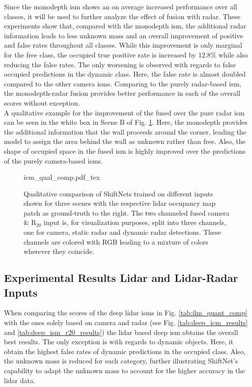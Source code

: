 Since the \gls{monodepth} \gls{ism} shows an on average increased performance over all classes, it will be used to further analyze the effect of fusion with radar. These experiments show that, compared with the \gls{monodepth} \gls{ism}, the additional radar information leads to less unknown mass and an overall improvement of positive and false rates throughout all classes. While this improvement is only marginal for the free class, the occupied true positive rate is increased by $12.8\%$ while also reducing the false rates. The only worsening is observed with regards to false occupied predictions in the dynamic class. Here, the false rate is almost doubled compared to the other camera \gls{ism}s. Comparing to the purely radar-based \gls{ism}, the \gls{monodepth}-radar fusion provides better performance in each of the overall scores without exception.\\ 
A qualitative example for the improvement of the fused over the pure radar \gls{ism} can be seen in the white box in Scene B of Fig. \ref{fig:icm_qual_comp}. Here, the \gls{monodepth} provides the additional information that the wall proceeds around the corner, leading the model to assign the area behind the wall as unknown rather than free. Also, the shape of occupied space in the fused \gls{ism} is highly improved over the predictions of the purely camera-based \gls{ism}s.
\begin{figure}[H]
\begin{center}
	{icm_qual_comp.pdf_tex}
	\caption{\label{fig:icm_qual_comp}Qualitative comparison of ShiftNets trained on different inputs shown for three scenes with the respective lidar occupancy map patch as ground-truth to the right. The two channeled fused camera \& R$_{20}$ input is, for visualization purposes, split into three channels, one for camera, static radar and dynamic radar detections. These channels are colored with RGB leading to a mixture of colors wherever they coincide.}
\end{center}
\end{figure}
%
\subsection{Experimental Results Lidar and Lidar-Radar Inputs}
\label{subsec:exp_lidar_fusion_in_deep_isms}
When comparing the scores of the deep lidar \gls{ism}s in Fig. \ref{tab:ilm_quant_comp} with the ones solely based on camera and radar (see Fig. \ref{tab:deep_icm_results} and \ref{tab:deep_ism_r20_results}) the lidar based deep \gls{ism} obtains the overall best results. The only exception is with regards to dynamic objects. Here, it obtain the highest false rates of dynamic predictions in the occupied class. Also, the unknown mass is reduced for each category, further illustrating ShiftNet's capability to adapt the unknown mass to account for the higher accuracy in the lidar data.

